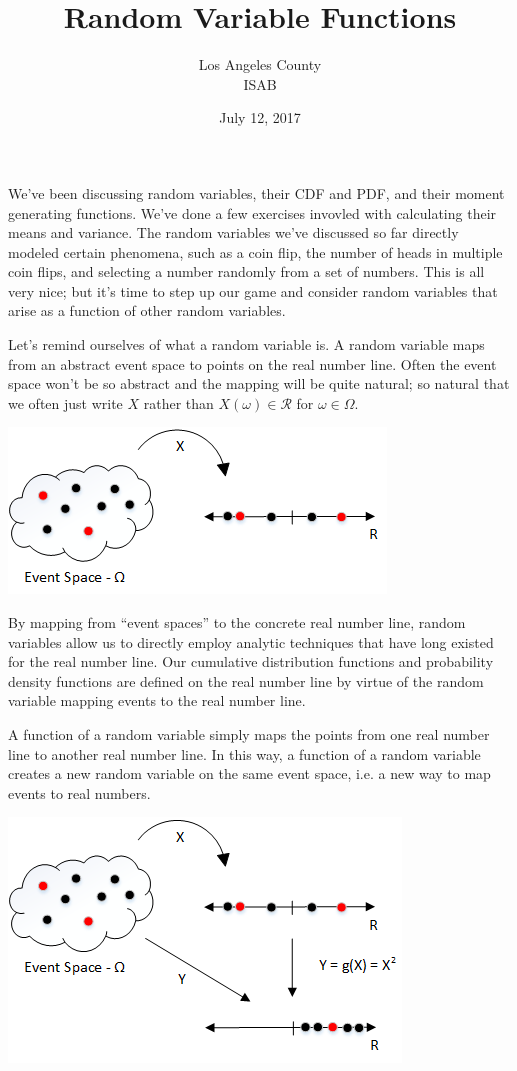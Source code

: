 \documentclass[]{article}
\title{Random Variable Functions}
\author{Los Angeles County\\ISAB}
\date{July 12, 2017}
\begin{document}
\maketitle

We've been discussing random variables, their CDF and PDF, and their
moment generating functions.  We've done a few exercises invovled with
calculating their means and variance.  The random variables we've discussed
so far directly modeled certain phenomena, such as a coin flip, the number
of heads in multiple coin flips, and selecting a number randomly from a set
of numbers.  This is all very nice; but it's time to step up our game and
consider random variables that arise as a function of other random variables.

Let's remind ourselves of what a random variable is.
A random variable maps from an abstract event space to points on
the real number line.  Often the event space won't be so abstract
and the mapping will be quite natural; so natural that we often just
write $X$ rather than
$X(\omega) \in \mathcal{R}$ for $\omega \in \Omega$.

\includegraphics[width=\linewidth]{rv1.png}

By mapping from ``event spaces'' to the concrete real number line,
random variables allow us to directly employ analytic techniques
that have long existed for the real number line.  Our
cumulative distribution functions and probability density functions
are defined on the real number line by virtue of the random variable
mapping events to the real number line.

A function of a random variable simply maps the points from one
real number line to another real number line.  In this way, a function
of a random variable creates a new random variable on the same event
space, i.e. a new way to map events to real numbers.

\includegraphics[width=\linewidth]{rv2.png}
\end{document}
